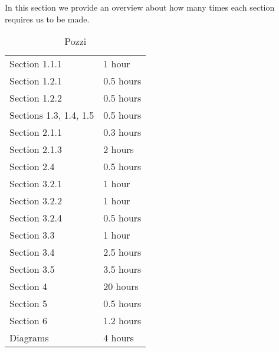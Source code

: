 In this section we provide an overview about how many times each section requires us to be made.


\begin{table} [H]
\centering
{}
{\centering
\begin{tabular}{m{2.5in}|m{.9in}}
Section 1.1.1 & 1 hour\\
Section 1.2.1 & 0.5 hours\\
Section 1.2.2 & 0.5 hours\\
Sections 1.3, 1.4, 1.5 & 0.5 hours\\
Section 2.1.1 & 0.3 hours\\
Section 2.1.3 & 2 hours\\
Section 2.4 & 0.5 hours\\
Section 3.2.1 & 1 hour\\
Section 3.2.2 & 1 hour\\
Section 3.2.4 & 0.5 hours\\
Section 3.3 & 1 hour\\
Section 3.4 & 2.5 hours\\
Section 3.5 & 3.5 hours\\
Section 4 & 20 hours\\
Section 5 & 0.5 hours\\
Section 6 & 1.2 hours\\
Diagrams & 4 hours
\end{tabular}
}
\caption{Pozzi}
\end{table}

